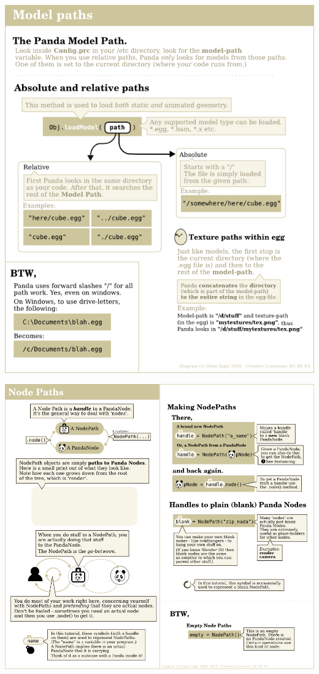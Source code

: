 \documentclass[a4paper,10pt]{book}
\begin{document}
\begin{center}
\includegraphics[scale=0.8]{ModelPath.png} 
\end{center}

\begin{center}
\includegraphics[scale=0.8]{NodePaths.png} 
\end{center}
\end{document}
